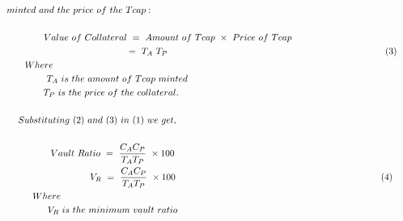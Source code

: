 {\begin{gather}
minted\ and\ the\ price\ of\ the\ Tcap:\ \ \ \ \ \ \ \ \ \ \ \ \ \ \ \ \ \ \ \ \ \ \ \ \ \ \ \ \ \ \ \ \ \ \ \ \ \ \ \ \ \ \ \ \ \ \ \ \ \ \ \ \ \ \ \ \ \ \ \ \ \ \ \ \ \ \ \ \ \ \ \ \ \ \  \notag\\
 \notag\\
Value\ of\ Collateral\ =\ Amount\ of\ Tcap\ \times \ Price\ of\ Tcap\ \ \ \ \ \ \ \ \ \ \ \ \ \ \ \ \  \notag\\
\ \ \ \ \ \ \ \ \ \ \ \ \ \ \ \ \ \ \ \ \ \ \ \ \ \ \ \ \ \ \ \ \ \ \ \ \ \ \ \ \ \ \ \ \ =\ T_{A} \ T_{P} \ \ \ \ \ \ \ \ \ \ \ \ \ \ \ \ \ \ \ \ \ \ \ \ \ \ \ \ \ \ \ \ \ \ \ \ \ \ \ \ \ \ \ \ \ \ \ \ \ \ \ \ \ \ \ \ \ \ \ \ \ \ \ \ \ \ \ \ \ \ \ ( 3)\\
\ \ \ \ \ \ \ \ Where\ \ \ \ \ \ \ \ \ \ \ \ \ \ \ \ \ \ \ \ \ \ \ \ \ \ \ \ \ \ \ \ \ \ \ \ \ \ \ \ \ \ \ \ \ \ \ \ \ \ \ \ \ \ \ \ \ \ \ \ \ \ \ \ \ \ \ \ \ \ \ \ \ \ \ \ \ \ \ \ \ \ \ \ \ \ \ \ \ \ \ \ \ \ \ \ \ \ \ \ \ \ \ \ \ \ \ \ \  \notag\\
\ \ \ \ \ \ \ \ \ T_{A} \ is\ the\ amount\ of\ Tcap\ minted\ \ \ \ \ \ \ \ \ \ \ \ \ \ \ \ \ \ \ \ \ \ \ \ \ \ \ \ \ \ \ \ \ \ \ \ \ \ \ \ \ \ \ \ \ \ \ \ \ \ \ \ \ \ \ \ \ \ \  \notag\\
\ \ \ \ \ \ \ \ T_{P} \ is\ the\ price\ of\ the\ collateral.\ \ \ \ \ \ \ \ \ \ \ \ \ \ \ \ \ \ \ \ \ \ \ \ \ \ \ \ \ \ \ \ \ \ \ \ \ \ \ \ \ \ \ \ \ \ \ \ \ \ \ \ \ \ \ \ \ \ \ \ \ \  \notag\\
 \notag\\
Substituting\ ( 2) \ and\ ( 3) \ in\ ( 1) \ we\ get,\ \ \ \ \ \ \ \ \ \ \ \ \ \ \ \ \ \ \ \ \ \ \ \ \ \ \ \ \ \ \ \ \ \ \ \ \ \ \ \ \ \ \ \ \ \ \ \ \ \ \ \ \ \ \ \ \ \ \ \ \ \ \  \notag\\
\  \notag\\
Vault\ Ratio\ =\ \frac{C_{A} C_{P}}{T_{A} T_{P}} \ \times 100\ \ \ \ \ \ \ \ \ \ \ \ \ \ \ \ \ \ \ \ \ \ \ \ \ \ \ \ \ \ \ \ \ \ \ \ \ \ \ \ \ \ \ \ \ \ \ \ \ \ \ \ \  \notag\\
\ \ \ \ \ \ \ \ \ \ \ \ \ \ \ \ \ \ \ \ \ \ \ \ \ \ \ \ \ \ \ V_{R} \ =\ \frac{C_{A} C_{P}}{T_{A} T_{P}} \ \times 100\ \ \ \ \ \ \ \ \ \ \ \ \ \ \ \ \ \ \ \ \ \ \ \ \ \ \ \ \ \ \ \ \ \ \ \ \ \ \ \ \ \ \ \ \ \ \ \ \ \ \ \ \ \ \ \ \ \ \ \ \ \ \ \ \ \ \ ( 4)\\
Where\ \ \ \ \ \ \ \ \ \ \ \ \ \ \ \ \ \ \ \ \ \ \ \ \ \ \ \ \ \ \ \ \ \ \ \ \ \ \ \ \ \ \ \ \ \ \ \ \ \ \ \ \ \ \ \ \ \ \ \ \ \ \ \ \ \ \ \ \ \ \ \ \ \ \ \ \ \ \ \ \ \ \ \ \ \ \ \ \ \ \ \ \ \ \ \  \notag\\
V_{R} \ is\ the\ minimum\ vault\ ratio\ \ \ \ \ \ \ \ \ \ \ \ \ \ \ \ \ \ \ \ \ \ \ \ \ \ \ \ \ \ \ \ \ \ \ \ \ \ \ \ \ \ \ \ \ \ \ \ \ \ \ \ \  \notag\\

\end{gather}}
